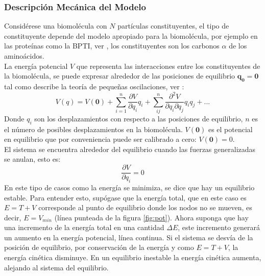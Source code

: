 \subsubsection{Descripci\'{o}n Mec\'{a}nica del Modelo}

Consid\'{e}rese una biomol\'{e}cula con $N$ part\'{i}culas constituyentes, el tipo de constituyente depende del modelo apropiado para la biomol\'{e}cula, por ejemplo en las prote\'{i}nas como la BPTI, ver \cite{Gur2013GlobalPredictions.}, los constituyentes son los carbonos $\alpha$ de los amino\'{a}cidos.\\

La energ\'{i}a potencial $V$ que representa las interacciones entre los constituyentes de la biomol\'{e}cula, se puede expresar alrededor de las posiciones de equilibrio $\mathbf{q_0}=\mathbf{0}$ tal como describe la teor\'{i}a de peque\~{n}as oscilaciones, ver \cite{Goldstein2001ClassicalMechanics}:
\begin{equation}
V(q)=V(\mathbf{0})+\sum_{i=1}^n\frac{\partial V}{\partial q_i}q_i+\sum_{ij}^{n}\frac{\partial^2 V }{\partial q_i\partial q_j}q_i q_j+...
\end{equation}\label{eq:1}
Donde $q_i$ son los desplazamientos con respecto a las posiciones de equilibrio, $n$ es el n\'{u}mero de posibles desplazamientos en la biomol\'{e}cula. $V(\mathbf{0})$ es el potencial en equilibrio que por conveniencia puede ser calibrado a cero: $V(\mathbf{0})=0$. \\


El sistema se encuentra alrededor del equilibrio cuando las fuerzas generalizadas se anulan, esto es:
\begin{equation}
\frac{\partial V}{\partial q_i}=0
\end{equation}\label{eq:2}
En este tipo de casos como la energ\'{i}a se minimiza, se dice que hay un equilibrio estable. Para entender esto, sup\'{o}gase que la energ\'{i}a total, que en este caso es $E=T+V$ corresponde al punto de equilibrio donde los nodos no se mueven, es decir, $E=V_{min}$ (l\'{i}nea punteada de la figura \ref{fig:pot}). Ahora suponga que hay una incremento de la energ\'{i}a total en una cantidad $\Delta E$, este incremento generar\'{a} un aumento en la energ\'{i}a potencial, l\'{i}nea continua.  Si el sistema se desv\'{i}a de la posici\'{o}n de equilibrio, por conservaci\'{o}n de la energ\'{i}a y como $E=T+V$, la energ\'{i}a cin\'{e}tica disminuye. En un equilibrio inestable la energ\'{i}a cin\'{e}tica aumenta, alejando al sistema del equilibrio. \cite{Goldstein2001ClassicalMechanics} \\


